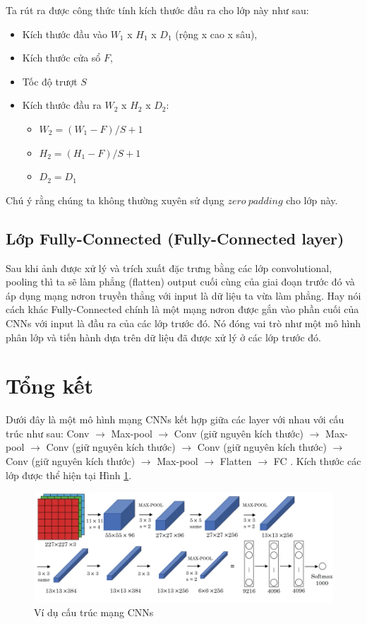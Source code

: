   Ta rút ra được công thức tính kích thước đầu ra cho lớp này như sau:
\begin{itemize}
	\item Kích thước đầu vào \textbf{$W_1$} x \textbf{$H_1$} x \textbf{$D_1$} (rộng x cao x sâu),
	\item Kích thước cửa sổ \textbf{$F$},	
	\item Tốc độ trượt \textbf{$S$}
	\item Kích thước đầu ra \textbf{$W_2$} x \textbf{$H_2$} x \textbf{$D_2$}:
	\begin{itemize}
		\item  \textbf{$W_2 = (W_1 - F)/S +1$}
		\item  \textbf{$H_2 = (H_1 - F)/S +1$}
		\item \textbf{$D_2 = D_1$}
	\end{itemize}	 
\end{itemize}
Chú ý rằng chúng ta không thường xuyên sử dụng $zero~padding$ cho lớp này.
\subsection{Lớp Fully-Connected (Fully-Connected layer)}
  Sau khi ảnh được xử lý và trích xuất đặc trưng bằng các lớp convolutional, pooling thì ta sẽ làm phẳng (flatten) output cuối cùng của giai đoạn trước đó và áp dụng mạng nơron truyền thẳng với input là dữ liệu ta vừa làm phẳng. Hay nói cách khác Fully-Connected chính là một mạng nơron được gắn vào phần cuối của CNNs với input là đầu ra của các lớp trước đó. Nó đóng vai trò như một mô hình phân lớp và tiến hành dựa trên dữ liệu đã được xử lý ở các lớp trước đó.
\section{Tổng kết}
  Dưới đây là một mô hình mạng CNNs kết hợp giữa các layer với nhau với cấu trúc như sau: Conv $\to$ Max-pool $\to$ Conv (giữ nguyên kích thước) $\to$ Max-pool $\to$ Conv (giữ nguyên kích thước) $\to$ Conv (giữ nguyên kích thước) $\to$ Conv (giữ nguyên kích thước) $\to$ Max-pool $\to$ Flatten $\to$ FC . Kích thước các lớp được thể hiện tại Hình \ref{fig:CNN}.
\begin{center}
\begin{figure}[H]
	\begin{center}
		\includegraphics[scale=0.5]{chap3/image/cnn/CNN.png}
	\end{center}
	\caption{Ví dụ cấu trúc mạng CNNs}
	\label{fig:CNN}
\end{figure}
\end{center}
